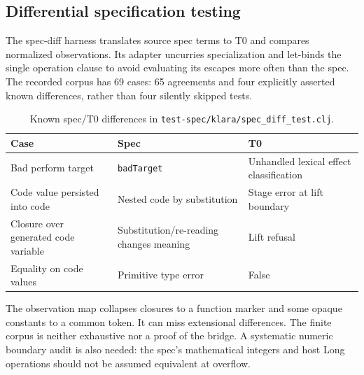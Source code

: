 \documentclass[acmsmall,screen,review,nonacm]{acmart}
\newcommand{\src}[1]{{\normalfont\nolinkurl{#1}}}
\begin{document}
\subsection{Differential specification testing}\label{sec:diff}
The spec-diff harness translates source spec terms to T0 and compares normalized
observations. Its adapter uncurries specialization and let-binds the single
operation clause to avoid evaluating its escapes more often than the spec.
The recorded corpus has 69 cases: 65 agreements and four explicitly asserted
known differences, rather than four silently skipped tests.
\begin{table}[t]
\caption{Known spec/T0 differences in \src{test-spec/klara/spec_diff_test.clj}.}
\small
\begin{tabular}{L{.27\linewidth}L{.29\linewidth}L{.34\linewidth}}
\toprule Case & Spec & T0\\\midrule
Bad perform target & \src{badTarget} & Unhandled lexical effect classification\\
Code value persisted into code & Nested code by substitution & Stage error at lift boundary\\
Closure over generated code variable & Substitution/re-reading changes meaning & Lift refusal\\
Equality on code values & Primitive type error & False\\\bottomrule
\end{tabular}
\end{table}
The observation map collapses closures to a function marker and some opaque
constants to a common token. It can miss extensional differences. The finite
corpus is neither exhaustive nor a proof of the bridge. A systematic numeric
boundary audit is also needed: the spec's mathematical integers and host Long
operations should not be assumed equivalent at overflow.
\end{document}
